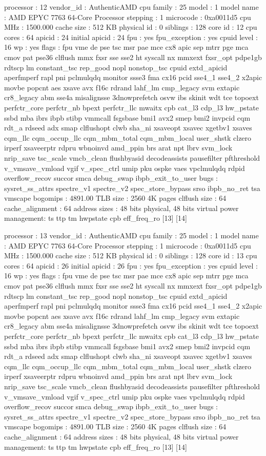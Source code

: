 processor	: 12
vendor_id	: AuthenticAMD
cpu family	: 25
model		: 1
model name	: AMD EPYC 7763 64-Core Processor
stepping	: 1
microcode	: 0xa0011d5
cpu MHz		: 1500.000
cache size	: 512 KB
physical id	: 0
siblings	: 128
core id		: 12
cpu cores	: 64
apicid		: 24
initial apicid	: 24
fpu		: yes
fpu_exception	: yes
cpuid level	: 16
wp		: yes
flags		: fpu vme de pse tsc msr pae mce cx8 apic sep mtrr pge mca cmov pat pse36 clflush mmx fxsr sse sse2 ht syscall nx mmxext fxsr_opt pdpe1gb rdtscp lm constant_tsc rep_good nopl nonstop_tsc cpuid extd_apicid aperfmperf rapl pni pclmulqdq monitor ssse3 fma cx16 pcid sse4_1 sse4_2 x2apic movbe popcnt aes xsave avx f16c rdrand lahf_lm cmp_legacy svm extapic cr8_legacy abm sse4a misalignsse 3dnowprefetch osvw ibs skinit wdt tce topoext perfctr_core perfctr_nb bpext perfctr_llc mwaitx cpb cat_l3 cdp_l3 hw_pstate ssbd mba ibrs ibpb stibp vmmcall fsgsbase bmi1 avx2 smep bmi2 invpcid cqm rdt_a rdseed adx smap clflushopt clwb sha_ni xsaveopt xsavec xgetbv1 xsaves cqm_llc cqm_occup_llc cqm_mbm_total cqm_mbm_local user_shstk clzero irperf xsaveerptr rdpru wbnoinvd amd_ppin brs arat npt lbrv svm_lock nrip_save tsc_scale vmcb_clean flushbyasid decodeassists pausefilter pfthreshold v_vmsave_vmload vgif v_spec_ctrl umip pku ospke vaes vpclmulqdq rdpid overflow_recov succor smca debug_swap ibpb_exit_to_user
bugs		: sysret_ss_attrs spectre_v1 spectre_v2 spec_store_bypass srso ibpb_no_ret tsa vmscape
bogomips	: 4891.00
TLB size	: 2560 4K pages
clflush size	: 64
cache_alignment	: 64
address sizes	: 48 bits physical, 48 bits virtual
power management: ts ttp tm hwpstate cpb eff_freq_ro [13] [14]

processor	: 13
vendor_id	: AuthenticAMD
cpu family	: 25
model		: 1
model name	: AMD EPYC 7763 64-Core Processor
stepping	: 1
microcode	: 0xa0011d5
cpu MHz		: 1500.000
cache size	: 512 KB
physical id	: 0
siblings	: 128
core id		: 13
cpu cores	: 64
apicid		: 26
initial apicid	: 26
fpu		: yes
fpu_exception	: yes
cpuid level	: 16
wp		: yes
flags		: fpu vme de pse tsc msr pae mce cx8 apic sep mtrr pge mca cmov pat pse36 clflush mmx fxsr sse sse2 ht syscall nx mmxext fxsr_opt pdpe1gb rdtscp lm constant_tsc rep_good nopl nonstop_tsc cpuid extd_apicid aperfmperf rapl pni pclmulqdq monitor ssse3 fma cx16 pcid sse4_1 sse4_2 x2apic movbe popcnt aes xsave avx f16c rdrand lahf_lm cmp_legacy svm extapic cr8_legacy abm sse4a misalignsse 3dnowprefetch osvw ibs skinit wdt tce topoext perfctr_core perfctr_nb bpext perfctr_llc mwaitx cpb cat_l3 cdp_l3 hw_pstate ssbd mba ibrs ibpb stibp vmmcall fsgsbase bmi1 avx2 smep bmi2 invpcid cqm rdt_a rdseed adx smap clflushopt clwb sha_ni xsaveopt xsavec xgetbv1 xsaves cqm_llc cqm_occup_llc cqm_mbm_total cqm_mbm_local user_shstk clzero irperf xsaveerptr rdpru wbnoinvd amd_ppin brs arat npt lbrv svm_lock nrip_save tsc_scale vmcb_clean flushbyasid decodeassists pausefilter pfthreshold v_vmsave_vmload vgif v_spec_ctrl umip pku ospke vaes vpclmulqdq rdpid overflow_recov succor smca debug_swap ibpb_exit_to_user
bugs		: sysret_ss_attrs spectre_v1 spectre_v2 spec_store_bypass srso ibpb_no_ret tsa vmscape
bogomips	: 4891.00
TLB size	: 2560 4K pages
clflush size	: 64
cache_alignment	: 64
address sizes	: 48 bits physical, 48 bits virtual
power management: ts ttp tm hwpstate cpb eff_freq_ro [13] [14]

